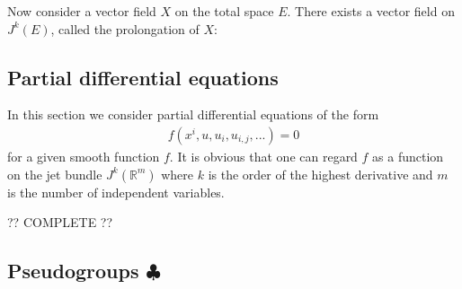     Now consider a vector field $X$ on the total space $E$. There exists a vector field on $J^k(E)$, called the prolongation of $X$:

\subsection{Partial differential equations}

    In this section we consider partial differential equations of the form
    \begin{gather}
        \label{diff:pde_jet}
        f(x^i, u, u_i, u_{i,j}, ...) = 0
    \end{gather}
    for a given smooth function $f$. It is obvious that one can regard $f$ as a function on the jet bundle $J^k(\mathbb{R}^m)$ where $k$ is the order of the highest derivative and $m$ is the number of independent variables.


    ?? COMPLETE ??

\subsection{\texorpdfstring{Pseudogroups $\clubsuit$}{Pseudogroups}}

